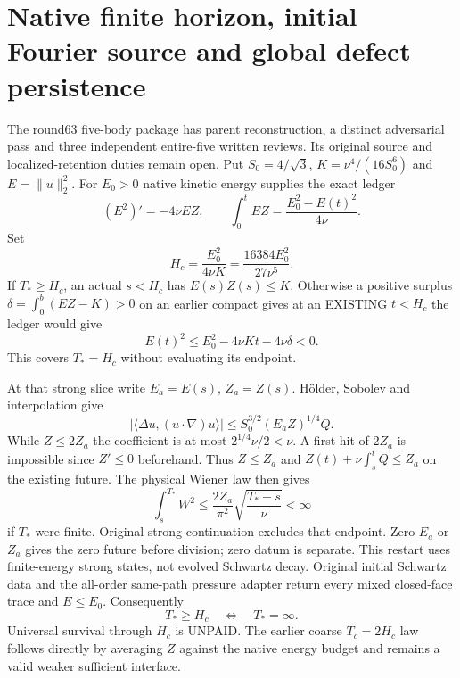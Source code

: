 \documentclass[11pt]{article}
\begin{document}
\section{Native finite horizon, initial Fourier source and global defect persistence}
\label{sec:native-finite-horizon}
The round63 five-body package has parent reconstruction, a distinct
adversarial pass and three independent entire-five written reviews.
Its original source and localized-retention duties remain open.
Put $S_0=4/\sqrt3$, $K=\nu^4/(16S_0^6)$ and $E=\|u\|_2^2$.
For $E_0>0$ native kinetic energy supplies the exact ledger
\[
 (E^2)'=-4\nu EZ,\qquad
 \int_0^t EZ=\frac{E_0^2-E(t)^2}{4\nu}.
\]
Set
\[
 H_c=\frac{E_0^2}{4\nu K}
     =\frac{16384E_0^2}{27\nu^5}.
\]
If $T_*\ge H_c$, an actual $s<H_c$ has $E(s)Z(s)\le K$.
Otherwise a positive surplus
$\delta=\int_0^b(EZ-K)>0$ on an earlier compact gives
at an EXISTING $t<H_c$ the ledger would give
\[
 E(t)^2\le E_0^2-4\nu Kt-4\nu\delta<0.
\]
This covers $T_*=H_c$ without evaluating its endpoint.

At that strong slice write $E_a=E(s)$, $Z_a=Z(s)$.
H\"older, Sobolev and interpolation give
\[
 |\langle\Delta u,(u\cdot\nabla)u\rangle|
 \le S_0^{3/2}(E_a Z)^{1/4}Q.
\]
While $Z\le2Z_a$ the coefficient is at most $2^{1/4}\nu/2<\nu$.
A first hit of $2Z_a$ is impossible since $Z'\le0$ beforehand.
Thus $Z\le Z_a$ and $Z(t)+\nu\int_s^tQ\le Z_a$ on the existing future.
The physical Wiener law then gives
\[
 \int_s^{T_*}W^2\le\frac{2Z_a}{\pi^2}
            \sqrt{\frac{T_*-s}{\nu}}<\infty
\]
if $T_*$ were finite. Original strong continuation excludes that endpoint.
Zero $E_a$ or $Z_a$ gives the zero future before division; zero datum is
separate. This restart uses finite-energy strong states, not evolved
Schwartz decay. Original initial Schwartz data and the all-order same-path
pressure adapter return every mixed closed-face trace and $E\le E_0$.
Consequently
\[
 T_*\ge H_c\quad\Longleftrightarrow\quad T_*=\infty.
\]
Universal survival through $H_c$ is UNPAID. The earlier coarse
$T_c=2H_c$ law follows directly by averaging $Z$ against the native energy
budget and remains a valid weaker sufficient interface.
\end{document}
